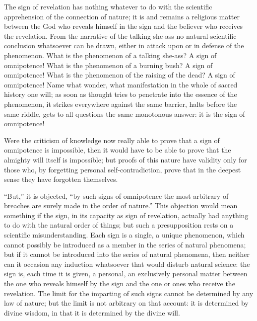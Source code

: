 \documentclass[12pt]{book}
\newcommand{\opage}[1]{\marginnote{\footnotesize\textit{[#1]}}}
\begin{document}
The sign of revelation has nothing whatever to do with the scientific
apprehension of the connection of nature; it is and remains a religious
matter between the God who reveals himself in the sign and the believer
who receives the revelation. From the narrative of the talking she-ass
no natural-scientific conclusion whatsoever can be drawn, either in
attack upon or in defense of the phenomenon. What is the phenomenon of a
talking she-ass? A sign of omnipotence! What is the
\opage{167}\setcounter{footnote}{0}%
phenomenon of a burning bush? A sign of omnipotence! What is the
phenomenon of the raising of the dead? A sign of omnipotence! Name what
wonder, what manifestation in the whole of sacred history one will; as
soon as thought tries to penetrate into the essence of the phenomenon,
it strikes everywhere against the same barrier, halts before the same
riddle, gets to all questions the same monotonous answer: it is the
sign of omnipotence!

Were the criticism of knowledge now really able to prove that a sign of
omnipotence is impossible, then it would have to be able to prove that
the almighty will itself is impossible; but proofs of this nature have
validity only for those who, by forgetting personal self-contradiction,
prove that in the deepest sense they have forgotten themselves.

``But,'' it is objected, ``by such signs of omnipotence the most
arbitrary of breaches are surely made in the order of nature.'' This
objection would mean something if the sign, in its capacity as sign of
revelation, actually had anything to do with the natural order of
things; but such a presupposition rests on a scientific
misunderstanding. Each sign is a single, a unique phenomenon, which
cannot possibly be introduced as a member in the series of natural
phenomena; but if it cannot be introduced into the series of natural
phenomena, then neither can it occasion any induction whatsoever that
would disturb natural science: the sign is, each time it is given, a
personal, an exclusively personal matter between the one who reveals
himself by the sign and the one or ones who receive the revelation. The
limit for the imparting of such signs cannot be determined by any law of
nature; but the limit is not arbitrary on that account: it is
determined by divine wisdom, in that it is determined by the divine
will.
\end{document}
